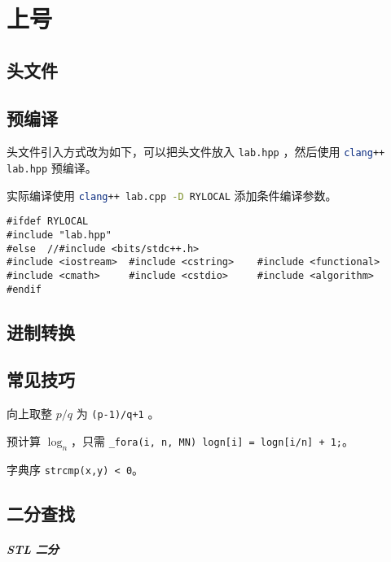 \chapter{上号}

\section{头文件}



\section{预编译}

头文件引入方式改为如下，可以把头文件放入 \lstinline[style=cpp]{lab.hpp} ，然后使用 \lstinline[language=bash]{clang++ lab.hpp} 预编译。

实际编译使用 \lstinline[language=bash]{clang++ lab.cpp -D RYLOCAL} 添加条件编译参数。

\begin{lstlisting}[style=cpp]
#ifdef RYLOCAL
#include "lab.hpp"
#else  //#include <bits/stdc++.h>
#include <iostream>  #include <cstring>    #include <functional>
#include <cmath>     #include <cstdio>     #include <algorithm>
#endif
\end{lstlisting}

\section{进制转换}



\section{常见技巧}

向上取整 $p/q$ 为 \lstinline[style=cpp]{(p-1)/q+1} 。

预计算 $\log_n$，只需 \lstinline[style=cpp]{_fora(i, n, MN) logn[i] = logn[i/n] + 1;}。

字典序 \lstinline[style=cpp]{strcmp(x,y) < 0}。

\section{二分查找}

\paragraph*{STL 二分}

